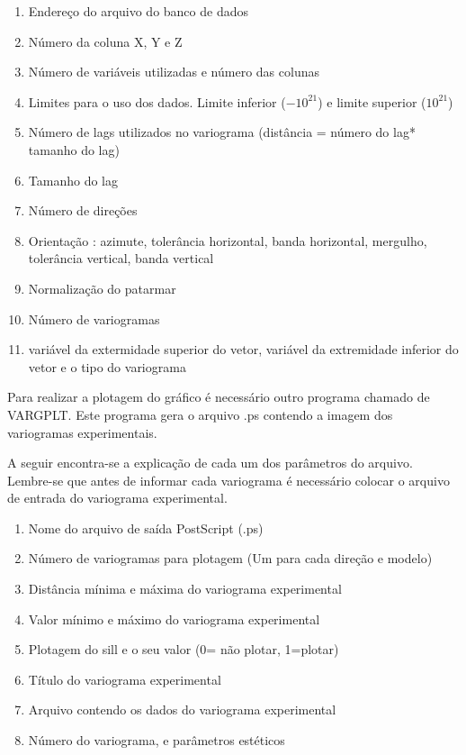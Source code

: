 \begin{enumerate}
	\item Endereço do arquivo do banco de dados 
	\item Número da coluna X, Y e Z
	\item Número de variáveis utilizadas e número das colunas 
	\item Limites para o uso dos dados. Limite inferior ($-10 ^{21}$) e limite superior ($10 ^{21} $)
	\item Número de lags utilizados no variograma (distância = número do lag* tamanho do lag)
	\item Tamanho do lag 
	\item Número de direções 
	\item Orientação : azimute, tolerância horizontal, banda horizontal, mergulho, tolerância vertical, banda vertical
	\item Normalização do patarmar 
	\item Número de variogramas 
	\item variável da extermidade superior do vetor, variável da extremidade inferior do vetor e o tipo do variograma
\end{enumerate}

Para realizar a plotagem do gráfico é necessário outro programa chamado de VARGPLT. Este programa gera o arquivo .ps contendo a imagem dos variogramas experimentais.

\begin{small}
	\begingroup
	
	\endgroup
\end{small}

A seguir encontra-se a explicação de cada um dos parâmetros do arquivo. Lembre-se que antes de informar cada variograma é necessário colocar o arquivo de entrada do variograma experimental.

\begin{enumerate}
	\item Nome do arquivo de saída PostScript (.ps)
	\item Número de variogramas para plotagem (Um para cada direção e modelo)
	\item Distância mínima e máxima do variograma experimental
	\item Valor mínimo e máximo do variograma experimental 
	\item Plotagem do sill e o seu valor (0= não plotar, 1=plotar)
	\item Título do variograma experimental 
	\item Arquivo contendo os dados do variograma experimental 
	\item Número do variograma, e parâmetros estéticos
\end{enumerate}


